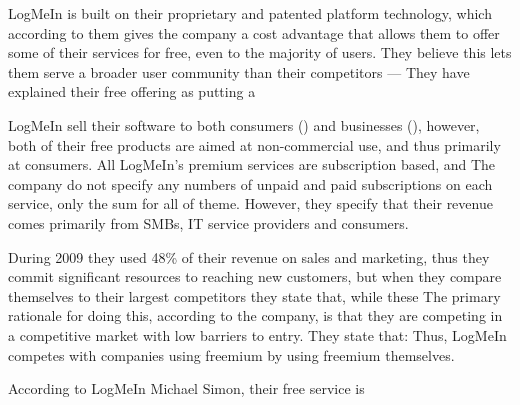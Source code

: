 LogMeIn is built on their proprietary and patented platform technology, which according to them gives the company a cost advantage that allows them to offer some of their services for free, even to the majority of users. They believe this lets them serve a broader user community than their competitors ---  They have explained their free offering as putting a 

LogMeIn sell their software to both consumers () and businesses (), however, both of their free products are aimed at non-commercial use, and thus primarily at consumers. All LogMeIn's premium services are subscription based, and  The company do not specify any numbers of unpaid and paid subscriptions on each service, only the sum for all of theme. However, they specify that their revenue comes primarily from SMBs, IT service providers and consumers.

During 2009 they used 48\% of their revenue on sales and marketing, thus they commit significant resources to reaching new customers, but when they compare themselves to their largest competitors they state that, while these  The primary rationale for doing this, according to the company, is that they are competing in a competitive market with low barriers to entry. They state that:  Thus, LogMeIn competes with companies using freemium by using freemium themselves.

According to LogMeIn  Michael Simon, their free service is 


